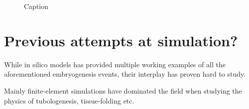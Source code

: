 \begin{figure}[H]
    \centering
    \vspace*{-1cm}
    \caption{Caption}
    \label{fig:enter-label}
\end{figure}
\newpage

\section{Previous attempts at simulation?}
While in silico models has provided multiple working examples of all the aforementioned embryogenesis events, their interplay has proven hard to study.

Mainly finite-element simulations have dominated the field when studying the physics of tubologenesis, tissue-folding etc.  


